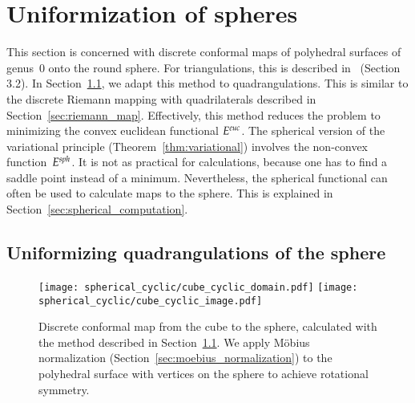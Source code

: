 \documentclass[Thesis]{subfiles}
\begin{document}
\section{Uniformization of spheres}
\label{sec:spheres}

This section is concerned with discrete conformal maps of polyhedral
surfaces of genus~$0$ onto the round sphere. For triangulations, this
is described in~\cite{BPS2015:dconf} (Section 3.2). In
Section~\ref{sec:spheres_euclidean}, we adapt this method to
quadrangulations. This is similar to the discrete Riemann mapping with
quadrilaterals described in
Section~\ref{sec:riemann_map}. Effectively, this method reduces the
problem to minimizing the convex euclidean functional $E^{\euc}$. The
spherical version of the variational principle
(Theorem~\ref{thm:variational}) involves the non-convex
function~$E^{\mathit{sph}}$. It is not as practical for calculations, because
one has to find a saddle point instead of a minimum. Nevertheless, the
spherical functional can often be used to calculate maps to the
sphere. This is explained in Section~\ref{sec:spherical_computation}.

\subsection{Uniformizing quadrangulations of the sphere}
\label{sec:spheres_euclidean}

\begin{figure}
\centering%
\texttt{[image: spherical\_cyclic/cube\_cyclic\_domain.pdf]}%
\hspace{0.1\textwidth}%
\texttt{[image: spherical\_cyclic/cube\_cyclic\_image.pdf]}\\
\caption{Discrete conformal map from the cube to the sphere,
  calculated with the method described in
  Section~\ref{sec:spheres_euclidean}. We apply M{\"o}bius
  normalization (Section~\ref{sec:moebius_normalization}) to the
  polyhedral surface with vertices on the sphere to achieve rotational
  symmetry.}
\label{fig:spherical_circular}
\end{figure}
\end{document}

